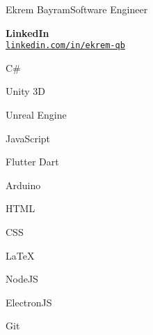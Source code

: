 \documentclass{article}
\begin{document}
\begin{cv}[avatar]{Ekrem Bayram}{Software Engineer}
    \cvseparator[3]
    \begin{cvitem}[Linkedin][4]
        \textbf{LinkedIn}\\
        \href{https://www.linkedin.com/in/ekrem-qb}{\texttt{\uline{linkedin.com/in/ekrem-qb}}}
    \end{cvitem}



    \begin{cvitem}
        C\#
    \end{cvitem}

    \cvseparator
    \begin{cvitem}
        Unity 3D
    \end{cvitem}

    \cvseparator
    \begin{cvitem}
        Unreal Engine
    \end{cvitem}

    \cvseparator
    \begin{cvitem}
        JavaScript
    \end{cvitem}

    \cvseparator
    \begin{cvitem}
        Flutter Dart
    \end{cvitem}

    \cvseparator
    \begin{cvitem}
        Arduino
    \end{cvitem}

    \cvseparator
    \begin{cvitem}
        HTML
    \end{cvitem}

    \cvseparator
    \begin{cvitem}
        CSS
    \end{cvitem}

    \cvseparator
    \begin{cvitem}
        LaTeX
    \end{cvitem}

    \cvseparator
    \begin{cvitem}
        NodeJS
    \end{cvitem}

    \cvseparator
    \begin{cvitem}
        ElectronJS
    \end{cvitem}

    \cvseparator
    \begin{cvitem}
        Git
    \end{cvitem}


\end{cv}
\end{document}
